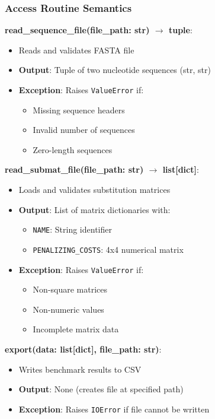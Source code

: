 \documentclass[12pt, titlepage]{article}
\begin{document}
\subsubsection{Access Routine Semantics}

\noindent \textbf{read\_sequence\_file(file\_path: str) $\rightarrow$ tuple}:
\begin{itemize}
    \item Reads and validates FASTA file
    \item \textbf{Output}: Tuple of two nucleotide sequences (str, str)
    \item \textbf{Exception}: Raises \texttt{ValueError} if:
    \begin{itemize}
        \item Missing sequence headers
        \item Invalid number of sequences
        \item Zero-length sequences
    \end{itemize}
\end{itemize}

\noindent \textbf{read\_submat\_file(file\_path: str) $\rightarrow$ list[dict]}:
\begin{itemize}
    \item Loads and validates substitution matrices
    \item \textbf{Output}: List of matrix dictionaries with:
    \begin{itemize}
        \item \texttt{NAME}: String identifier
        \item \texttt{PENALIZING\_COSTS}: 4x4 numerical matrix
    \end{itemize}
    \item \textbf{Exception}: Raises \texttt{ValueError} if:
    \begin{itemize}
        \item Non-square matrices
        \item Non-numeric values
        \item Incomplete matrix data
    \end{itemize}
\end{itemize}

\noindent \textbf{export(data: list[dict], file\_path: str)}:
\begin{itemize}
    \item Writes benchmark results to CSV
    \item \textbf{Output}: None (creates file at specified path)
    \item \textbf{Exception}: Raises \texttt{IOError} if file cannot be written
\end{itemize}
\end{document}
